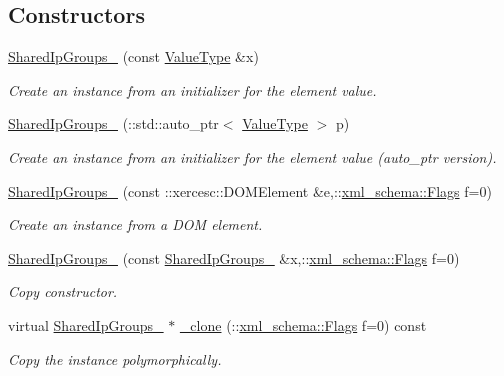 \subsection*{Constructors}
\begin{DoxyCompactItemize}
\item 
\hyperlink{classopenstack_1_1xml_1_1SharedIpGroups___ac006a94408b9500ff30047fa2f3ec792}{SharedIpGroups\_\-} (const \hyperlink{classopenstack_1_1xml_1_1SharedIpGroups}{ValueType} \&x)
\begin{DoxyCompactList}\small\item\em Create an instance from an initializer for the element value. \item\end{DoxyCompactList}\item 
\hyperlink{classopenstack_1_1xml_1_1SharedIpGroups___a3a2e32fd1ab0b33fe3930e69d6e4bcc6}{SharedIpGroups\_\-} (::std::auto\_\-ptr$<$ \hyperlink{classopenstack_1_1xml_1_1SharedIpGroups}{ValueType} $>$ p)
\begin{DoxyCompactList}\small\item\em Create an instance from an initializer for the element value (auto\_\-ptr version). \item\end{DoxyCompactList}\item 
\hyperlink{classopenstack_1_1xml_1_1SharedIpGroups___ad91928b4c358827b80278d50dff85de9}{SharedIpGroups\_\-} (const ::xercesc::DOMElement \&e,::\hyperlink{namespacexml__schema_affb4c227cbd9aa7453dd1dc5a1401943}{xml\_\-schema::Flags} f=0)
\begin{DoxyCompactList}\small\item\em Create an instance from a DOM element. \item\end{DoxyCompactList}\item 
\hyperlink{classopenstack_1_1xml_1_1SharedIpGroups___ab4ac9cb109bd1d92f19f8da9fac74746}{SharedIpGroups\_\-} (const \hyperlink{classopenstack_1_1xml_1_1SharedIpGroups__}{SharedIpGroups\_\-} \&x,::\hyperlink{namespacexml__schema_affb4c227cbd9aa7453dd1dc5a1401943}{xml\_\-schema::Flags} f=0)
\begin{DoxyCompactList}\small\item\em Copy constructor. \item\end{DoxyCompactList}\item 
virtual \hyperlink{classopenstack_1_1xml_1_1SharedIpGroups__}{SharedIpGroups\_\-} $\ast$ \hyperlink{classopenstack_1_1xml_1_1SharedIpGroups___afbeed443c975ae39c1dc2f660023a3fe}{\_\-clone} (::\hyperlink{namespacexml__schema_affb4c227cbd9aa7453dd1dc5a1401943}{xml\_\-schema::Flags} f=0) const 
\begin{DoxyCompactList}\small\item\em Copy the instance polymorphically. \item\end{DoxyCompactList}\end{DoxyCompactItemize}
